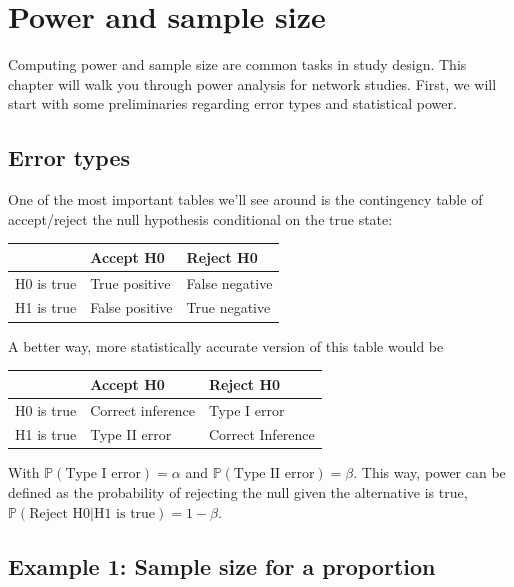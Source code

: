\documentclass[
]{book}
\begin{document}
\hypertarget{part2-power}{%
\chapter{Power and sample size}\label{part2-power}}

Computing power and sample size are common tasks in study design. This chapter will walk you
through power analysis for network studies. First, we will start with some preliminaries
regarding error types and statistical power.

\hypertarget{error-types}{%
\section{Error types}\label{error-types}}

One of the most important tables we'll see around is the contingency table of accept/reject the null hypothesis conditional on the true state:

\begin{tabular}{l|l|l}
\hline
  & Accept H0 & Reject H0\\
\hline
H0 is true & True positive & False negative\\
\hline
H1 is true & False positive & True negative\\
\hline
\end{tabular}

A better way, more statistically accurate version of this table would be

\begin{tabular}{l|l|l}
\hline
  & Accept H0 & Reject H0\\
\hline
H0 is true & Correct inference & Type I error\\
\hline
H1 is true & Type II error & Correct Inference\\
\hline
\end{tabular}

With \(\mathbb{P}{(\mbox{Type I error})} = \alpha\) and \(\mathbb{P}{(\mbox{Type II error})} = \beta\). This way, power can be defined as the
probability of rejecting the null given the alternative is true, \(\mathbb{P}{(\mbox{Reject H0}|\mbox{H1 is true})} = 1-\beta\).

\hypertarget{example-1-sample-size-for-a-proportion}{%
\section{Example 1: Sample size for a proportion}\label{example-1-sample-size-for-a-proportion}}
\end{document}
